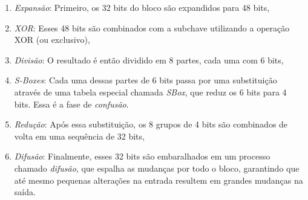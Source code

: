 \begin{enumerate}
    \item {\em Expansão}: Primeiro, os 32 bits do bloco são expandidos para 48 bits,
    \item {\em XOR}: Esses 48 bits são combinados com a subchave utilizando a operação XOR (ou exclusivo),
    \item {\em Divisão}: O resultado é então dividido em 8 partes, cada uma com 6 bits,
    \item {\em S-Boxes}: Cada uma dessas partes de 6 bits passa por uma substituição através de uma tabela especial chamada \textit{SBox}, que reduz os 6 bits para 4 bits.
      Essa é a fase de \textit{confusão}.
    \item {\em Redução}: Após essa substituição, os 8 grupos de 4 bits são combinados de volta em uma sequência de 32 bits,
    \item {\em Difusão}: Finalmente, esses 32 bits são embaralhados em um processo chamado \textit{difusão}, que espalha as mudanças por todo o bloco, garantindo que até mesmo pequenas alterações na entrada resultem em grandes mudanças na saída.
\end{enumerate}

